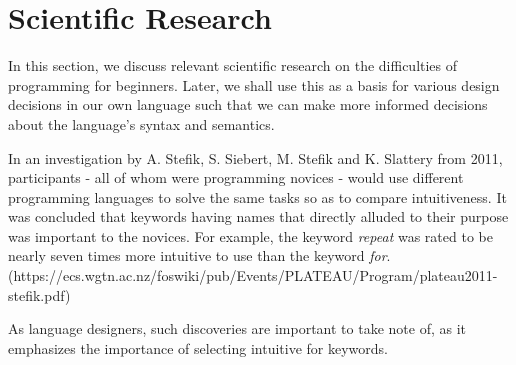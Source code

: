 \chapter{Scientific Research} \label{chap:analysis}
In this section, we discuss relevant scientific research on the difficulties of programming for beginners.
Later, we shall use this as a basis for various design decisions in our own language such that we can make more 
informed decisions about the language's syntax and semantics.

In an investigation by A. Stefik, S. Siebert, M. Stefik and K. Slattery from 2011, participants - all of whom were
programming novices - would use different programming languages to solve the same tasks so as to compare intuitiveness. 
It was concluded that keywords having names that directly alluded to their purpose was important to the novices. 
For example, the keyword \emph{repeat} was rated to be nearly seven times more intuitive to use than the keyword \emph{for}. 
(https://ecs.wgtn.ac.nz/foswiki/pub/Events/PLATEAU/Program/plateau2011-stefik.pdf)

As language designers, such discoveries are important to take note of, as it emphasizes the importance of selecting intuitive for keywords.